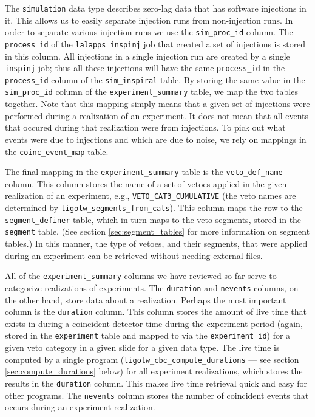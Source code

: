 The \texttt{simulation} data type describes zero-lag data that has software injections in it. This allows us to easily separate injection runs from non-injection runs. In order to separate various injection runs we use the \texttt{sim\_proc\_id} column. The \texttt{process\_id} of the \texttt{lalapps\_inspinj} job that created a set of injections is stored in this column. All injections in a single injection run are created by a single \texttt{inspinj} job; thus all these injections will have the same \texttt{process\_id} in the \texttt{process\_id} column of the \texttt{sim\_inspiral} table. By storing the same value in the \texttt{sim\_proc\_id} column of the \texttt{experiment\_summary} table, we map the two tables together. Note that this mapping simply means that a given set of injections were performed during a realization of an experiment. It does not mean that all events that occured during that realization were from injections. To pick out what events were due to injections and which are due to noise, we rely on mappings in the \texttt{coinc\_event\_map} table.

The final mapping in the \texttt{experiment\_summary} table is the
\texttt{veto\_def\_name} column. This column stores the name of a set of vetoes
applied in the given realization of an experiment, e.g.,
\texttt{VETO\_CAT3\_CUMULATIVE} (the veto names are determined by
\texttt{ligolw\_segments\_from\_cats}). This column maps the row to the
\texttt{segment\_definer} table, which in turn maps to the veto segments,
stored in the \texttt{segment} table. (See section \ref{sec:segment_tables} for
more information on segment tables.) In this manner, the type of vetoes, and
their segments, that were applied during an experiment can be retrieved without
needing external files.

All of the \texttt{experiment\_summary} columns we have reviewed so far serve
to categorize realizations of experiments. The \texttt{duration} and
\texttt{nevents} columns, on the other hand, store data about a realization.
Perhaps the most important column is the \texttt{duration} column. This column
stores the amount of live time that exists in during a coincident detector time
during the experiment period (again, stored in the \texttt{experiment} table
and mapped to via the \texttt{experiment\_id}) for a given veto category in a
given slide for a given data type. The live time is computed by a single
program (\texttt{ligolw\_cbc\_compute\_durations} --- see section
\ref{sec:compute_durations} below) for all experiment realizations, which
stores the results in the \texttt{duration} column. This makes live time
retrieval quick and easy for other programs. The \texttt{nevents} column stores
the number of coincident events that occurs during an experiment realization.

